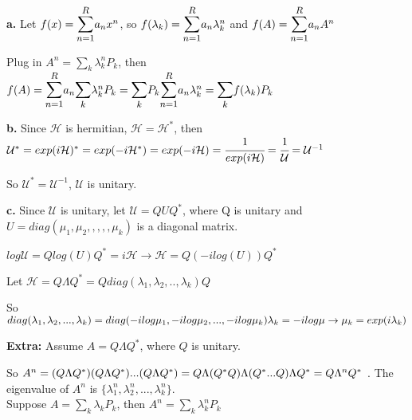 \documentclass[11pt,a4paper]{article}
\newcommand{\mh}{\mathcal{H}}
\newcommand{\mmu}{\mathcal{U}}
\begin{document}
\newpage 
{}
\textbf{a.}
Let $f(x)=\bsum{n=1}{R}a_nx^n$, so $f(\lambda_k)=\bsum{n=1}{R}a_n\lambda_k^n$ and $f(A)=\bsum{n=1}{R}a_nA^n$

Plug in $A^n=\sum_k\lambda_k^nP_k$, then\\
$f(A)=\bsum{n=1}{R}a_n\bsum{k}{}\lambda_k^nP_k=\bsum{k}{}P_k\bsum{n=1}{R}a_n\lambda_k^n=\bsum{k}{}f(\lambda_k)P_k$

 
\textbf{b.} 
Since $\mh$ is hermitian, $\mh=\mh^*$, then \\

$\mmu^*=exp(i\mh)^*=exp(-i\mh^*)=exp(-i\mh)=\cfrac{1}{exp(i\mh)}=\cfrac{1}{\mmu}=\mmu^{-1}$

So $\mmu^*=\mmu^{-1}$, $\mmu$ is unitary.

\textbf{c.} Since $\mmu$ is unitary, let $\mmu=QU Q^*$, where Q is unitary and $U=diag(\mu_1,\mu_2,,,,,\mu_k)$ is a diagonal matrix. 

$log\mmu=Qlog(U) Q^*=i\mh\longrightarrow \mh=Q(-ilog(U))Q^*$ 

Let $\mh=Q\Lambda Q^*=Qdiag(\lambda_1, \lambda_2, .., \lambda_k)Q$

So $diag(\lambda_1,\lambda_2,...,\lambda_k)=diag(-ilog\mu_1,-ilog\mu_2,...,-ilog\mu_k)\\
\lambda_k=-ilog\mu\rightarrow \mu_k=exp(i\lambda_k)$

\textbf{Extra:} Assume $A=Q\Lambda Q^*$, where $Q$ is unitary. 

So $A^n=(Q\Lambda Q^*)(Q\Lambda Q^*)...(Q\Lambda Q^*)\\
=Q\Lambda (Q^*Q)\Lambda(Q^*...Q)\Lambda Q^*=Q\Lambda^nQ^*$
. The eigenvalue of $A^n$ is $\{\lambda_1^n, \lambda_2^n, ..., \lambda_k^n\}$.\\
Suppose $A=\sum_k \lambda_kP_k$, then $A^n=\sum_k\lambda_k^nP_k$
\end{document}
